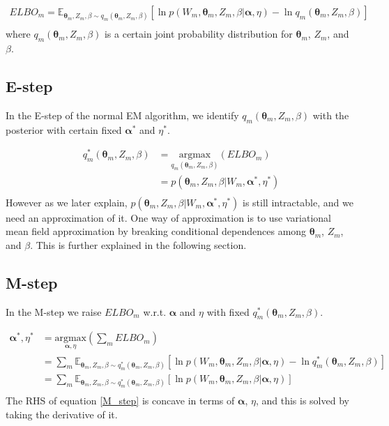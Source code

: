 \documentclass[a4]{article}
\begin{document}
\begin{equation}
\begin{aligned}
ELBO_m = \mathbb{E}_{\bm{\theta}_m, Z_m, \beta \sim q_m(\bm{\theta}_m, Z_m, \beta)}
[\ln p( W_m, \bm{\theta}_m, Z_m, \beta | \bm{\alpha}, \eta ) - \ln q_m(\bm{\theta}_m, Z_m, \beta)]
\label{ELBO_m}\\
\end{aligned}
\end{equation}
where $q_m(\bm{\theta}_m, Z_m, \beta)$ is a certain joint probability distribution for 
$\bm{\theta}_m$, $Z_m$, and $\beta$.
\subsection{E-step}
In the E-step of the normal EM algorithm, we identify
$q_m(\bm{\theta}_m, Z_m, \beta)$ with the posterior with certain fixed 
$\bm{\alpha}^*$ and $\eta^*$.

\begin{equation}
\begin{aligned}
q_m^{*}(\bm{\theta}_m, Z_m, \beta) &= 
\underset{ q_m(\bm{\theta}_m, Z_m, \beta) }
{\mathrm{argmax}} ( ELBO_m )\\
&= p( \bm{\theta}_m, Z_{m}, \beta | W_m, \bm{\alpha}^*, \eta^* )\label{normal_EM_conditional}\\
\end{aligned}
\end{equation}
However as we later explain, $p( \bm{\theta}_m, Z_{m}, \beta | W_m, \bm{\alpha}^*, \eta^* )$ is still intractable, and
we need an approximation of it. One way of approximation is to use variational mean field approximation by breaking
conditional dependences among $\bm{\theta}_m$, $Z_m$, and $\beta$. This is further explained in the following section.


\subsection{M-step}
In the M-step we raise $ELBO_m$ w.r.t. $\bm{\alpha}$ and $\eta$ with fixed $q_m^{*}(\bm{\theta}_m, Z_m, \beta)$.

\begin{equation}
\begin{aligned}
\bm{\alpha}^*, \eta^* &= \underset{\bm{\alpha},\eta}{\mathrm{argmax}} \left( \sum_m ELBO_m \right)\\
&= \sum_m \mathbb{E}_{\bm{\theta}_m, Z_m, \beta \sim q^*_m(\bm{\theta}_m, Z_m, \beta)}
[\ln p( W_m, \bm{\theta}_m, Z_m, \beta | \bm{\alpha}, \eta ) - \ln q^*_m(\bm{\theta}_m, Z_m, \beta)]\\
&= \sum_m \mathbb{E}_{\bm{\theta}_m, Z_m, \beta \sim q^*_m(\bm{\theta}_m, Z_m, \beta)}
[\ln p( W_m, \bm{\theta}_m, Z_m, \beta | \bm{\alpha}, \eta ) ]\label{M_step}\\
\end{aligned}
\end{equation}
The RHS of equation \ref{M_step} is concave in terms of $\bm{\alpha}$, $\eta$, and this is solved by taking the
derivative of it.
\end{document}
